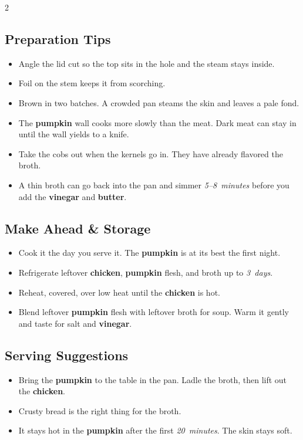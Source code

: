 \documentclass[11pt,letterpaper]{article}
\begin{document}
{\begin{multicols}{2}
\subsection*{Preparation Tips}
\begin{itemize}
    \item Angle the lid cut so the top sits in the hole and the steam stays inside.
    \item Foil on the stem keeps it from scorching.
    \item Brown in two batches. A crowded pan steams the skin and leaves a pale fond.
    \item The \textbf{pumpkin} wall cooks more slowly than the meat. Dark meat can stay in until the wall yields to a knife.
    \item Take the cobs out when the kernels go in. They have already flavored the broth.
    \item A thin broth can go back into the pan and simmer \textit{5--8~minutes} before you add the \textbf{vinegar} and \textbf{butter}.
\end{itemize}

\subsection*{Make Ahead \& Storage}
\begin{itemize}
    \item Cook it the day you serve it. The \textbf{pumpkin} is at its best the first night.
    \item Refrigerate leftover \textbf{chicken}, \textbf{pumpkin} flesh, and broth up to \textit{3~days}.
    \item Reheat, covered, over low heat until the \textbf{chicken} is hot.
    \item Blend leftover \textbf{pumpkin} flesh with leftover broth for soup. Warm it gently and taste for salt and \textbf{vinegar}.
\end{itemize}

\subsection*{Serving Suggestions}
\begin{itemize}
    \item Bring the \textbf{pumpkin} to the table in the pan. Ladle the broth, then lift out the \textbf{chicken}.
    \item Crusty bread is the right thing for the broth.
    \item It stays hot in the \textbf{pumpkin} after the first \textit{20~minutes}. The skin stays soft.
\end{itemize}

\end{multicols}
}
\end{document}
